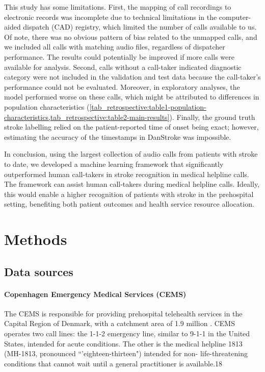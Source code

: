 {This study has some limitations. First, the mapping of call recordings to electronic records was incomplete due to technical limitations in the computer-aided dispatch (CAD) registry, which limited the number of calls available to us. Of note, there was no obvious pattern of bias related to the unmapped calls, and we included all calls with matching audio files, regardless of dispatcher performance. The results could potentially be improved if more calls were available for analysis. Second, calls without a call-taker indicated diagnostic category were not included in the validation and test data because the call-taker's performance could not be evaluated. Moreover, in exploratory analyses, the model performed worse on these calls, which might be attributed to differences in population characteristics (\cref{tab_retrospective:table1-population-characteristics,tab_retrospective:table2-main-results}). Finally, the ground truth stroke labelling relied on the patient-reported time of onset being exact; however, estimating the accuracy of the timestamps in DanStroke was impossible.

In conclusion, using the largest collection of audio calls from patients with stroke to date, we developed a machine learning framework that significantly outperformed human call-takers in stroke recognition in medical helpline calls. The framework can assist human call-takers during medical helpline calls. Ideally, this would enable a higher recognition of patients with stroke in the prehospital setting, benefiting both patient outcomes and health service resource allocation.


\section{Methods}

\subsection{Data sources}

\paragraph{Copenhagen Emergency Medical Services (CEMS)}

The CEMS is responsible for providing prehospital telehealth services in the Capital Region of Denmark, with a catchment area of 1.9 million \cite{cite17}. CEMS operates two call lines: the 1-1-2 emergency line, similar to 9-1-1 in the United States, intended for acute conditions. The other is the medical helpline 1813 (MH-1813, pronounced ``'eighteen-thirteen") intended for non- life-threatening conditions that cannot wait until a general practitioner is available.18

}
